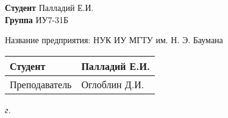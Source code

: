 \begin{titlepage}
	\vspace{1mm}
	
	\begin{flushleft}
		\textbf{Студент} \uline{\hspace{5cm}} Палладий Е.И. \\
		\vspace{5mm}
		\textbf{Группа} \uline{\hspace{5cm}} ИУ7-31Б \\
	\end{flushleft}
	
	\vspace{40mm}
	
	\begin{flushleft}
		Название предприятия: НУК ИУ МГТУ им. Н. Э. Баумана \\
	\end{flushleft}
	
	
	\begin{flushleft}
		\begin{tabular}{|p{}|p{0.45\textwidth}|}
			\hline
			Студент & \uline{\hspace{3cm}} Палладий Е.И. \\
			\hline
			Преподаватель & \uline{\hspace{3cm}} Оглоблин Д.И.\\
			\hline
		\end{tabular}
	\end{flushleft}
	
	
	\centering\textit{{\the\year} г.}
\end{titlepage}